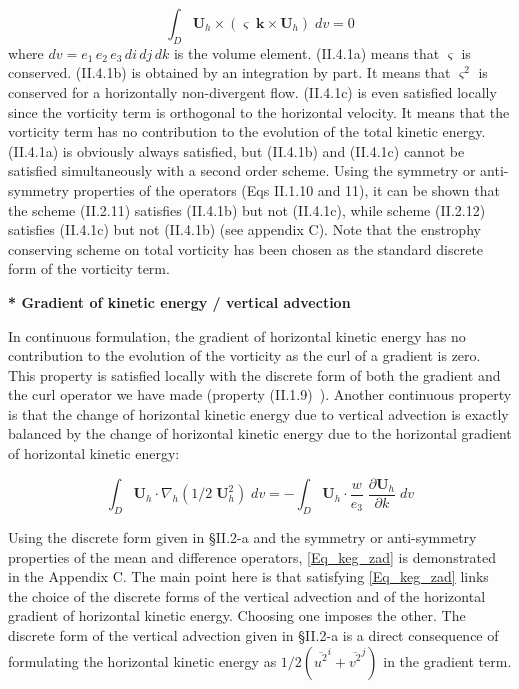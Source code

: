 \begin{equation} \label{Eq_vor_energy}
\int_D {{\textbf{U}}_h \times \left( {\varsigma \;{\textbf{k}}\times {\textbf{U}}_h } \right)\;dv} =0
\end{equation}
where $dv = e_1\, e_2\, e_3\, di\, dj\, dk$ is the volume element. 
(II.4.1a) means that $\varsigma $ is conserved. (II.4.1b) is obtained by an 
integration by part. It means that $\varsigma^2$ is conserved for a horizontally 
non-divergent flow. 
(II.4.1c) is even satisfied locally since the vorticity term is orthogonal 
to the horizontal velocity. It means that the vorticity term has no 
contribution to the evolution of the total kinetic energy. (II.4.1a) is 
obviously always satisfied, but (II.4.1b) and (II.4.1c) cannot be satisfied 
simultaneously with a second order scheme. Using the symmetry or 
anti-symmetry properties of the operators (Eqs II.1.10 and 11), it can be 
shown that the scheme (II.2.11) satisfies (II.4.1b) but not (II.4.1c), while 
scheme (II.2.12) satisfies (II.4.1c) but not (II.4.1b) (see appendix C). 
Note that the enstrophy conserving scheme on total vorticity has been chosen 
as the standard discrete form of the vorticity term.

\textbf{* Gradient of kinetic energy / vertical advection}

In continuous formulation, the gradient of horizontal kinetic energy has no 
contribution to the evolution of the vorticity as the curl of a gradient is 
zero. This property is satisfied locally with the discrete form of both the 
gradient and the curl operator we have made (property (II.1.9)~). Another 
continuous property is that the change of horizontal kinetic energy due to 
vertical advection is exactly balanced by the change of horizontal kinetic 
energy due to the horizontal gradient of horizontal kinetic energy:

\begin{equation} \label{Eq_keg_zad}
\int_D {{\textbf{U}}_h \cdot \nabla _h \left( {1/2\;{\textbf{U}}_h ^2} \right)\;dv} =-\int_D {{\textbf{U}}_h \cdot \frac{w}{e_3 }\;\frac{\partial 
{\textbf{U}}_h }{\partial k}\;dv}
\end{equation}

Using the discrete form given in {\S}II.2-a and the symmetry or 
anti-symmetry properties of the mean and difference operators, \eqref{Eq_keg_zad} is 
demonstrated in the Appendix C. The main point here is that satisfying 
\eqref{Eq_keg_zad} links the choice of the discrete forms of the vertical advection 
and of the horizontal gradient of horizontal kinetic energy. Choosing one 
imposes the other. The discrete form of the vertical advection given in 
{\S}II.2-a is a direct consequence of formulating the horizontal kinetic 
energy as $1/2 \left( \overline{u^2}^i + \overline{v^2}^j \right) $ in the gradient term.

